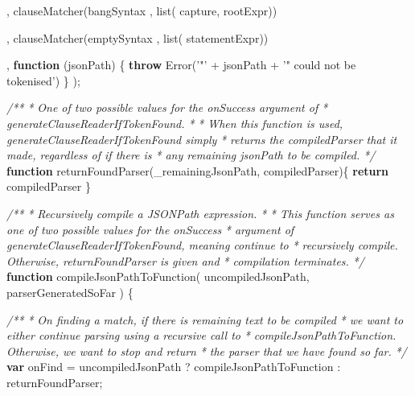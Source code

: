 \documentclass[]{article}
\newenvironment{Shaded}{}{}
\newcommand{\KeywordTok}[1]{\textcolor[rgb]{0.00,0.44,0.13}{\textbf{{#1}}}}
\newcommand{\StringTok}[1]{\textcolor[rgb]{0.25,0.44,0.63}{{#1}}}
\newcommand{\CommentTok}[1]{\textcolor[rgb]{0.38,0.63,0.69}{\textit{{#1}}}}
\newcommand{\FunctionTok}[1]{\textcolor[rgb]{0.02,0.16,0.49}{{#1}}}
\newcommand{\NormalTok}[1]{{#1}}
\begin{document}
\begin{Shaded}
\begin{Highlighting}[]
   \NormalTok{,  }\FunctionTok{clauseMatcher}\NormalTok{(bangSyntax       , }\FunctionTok{list}\NormalTok{( capture,}
                                             \NormalTok{rootExpr))}
                                                          
   \NormalTok{,  }\FunctionTok{clauseMatcher}\NormalTok{(emptySyntax      , }\FunctionTok{list}\NormalTok{( statementExpr))}
   
   \NormalTok{,  }\KeywordTok{function} \NormalTok{(jsonPath) \{}
         \KeywordTok{throw} \FunctionTok{Error}\NormalTok{(}\StringTok{'"'} \NormalTok{+ jsonPath + }\StringTok{'" could not be tokenised'}\NormalTok{)      }
      \NormalTok{\}}
   \NormalTok{);}


   \CommentTok{/**}
\CommentTok{    * One of two possible values for the onSuccess argument of }
\CommentTok{    * generateClauseReaderIfTokenFound.}
\CommentTok{    * }
\CommentTok{    * When this function is used, generateClauseReaderIfTokenFound simply }
\CommentTok{    * returns the compiledParser that it made, regardless of if there is }
\CommentTok{    * any remaining jsonPath to be compiled.}
\CommentTok{    */}
   \KeywordTok{function} \FunctionTok{returnFoundParser}\NormalTok{(_remainingJsonPath, compiledParser)\{ }
      \KeywordTok{return} \NormalTok{compiledParser }
   \NormalTok{\}     }
              
   \CommentTok{/**}
\CommentTok{    * Recursively compile a JSONPath expression.}
\CommentTok{    * }
\CommentTok{    * This function serves as one of two possible values for the onSuccess }
\CommentTok{    * argument of generateClauseReaderIfTokenFound, meaning continue to}
\CommentTok{    * recursively compile. Otherwise, returnFoundParser is given and}
\CommentTok{    * compilation terminates.}
\CommentTok{    */}
   \KeywordTok{function} \FunctionTok{compileJsonPathToFunction}\NormalTok{( uncompiledJsonPath, }
                                       \NormalTok{parserGeneratedSoFar ) \{}

      \CommentTok{/**}
\CommentTok{       * On finding a match, if there is remaining text to be compiled}
\CommentTok{       * we want to either continue parsing using a recursive call to }
\CommentTok{       * compileJsonPathToFunction. Otherwise, we want to stop and return }
\CommentTok{       * the parser that we have found so far.}
\CommentTok{       */}
      \KeywordTok{var} \NormalTok{onFind =      uncompiledJsonPath}
                     \NormalTok{?  compileJsonPathToFunction }
                     \NormalTok{:  returnFoundParser;}
                   

\end{Highlighting}
\end{Shaded}
\end{document}
